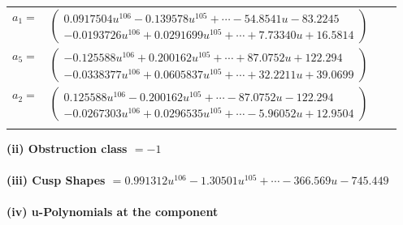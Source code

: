 \documentclass[1p]{elsarticle_modified}
\theoremstyle{definition}
\begin{document}
\begin{tabular}{m{7pt} m{180pt} m{7pt} m{180pt} }
\flushright $a_{1}=$&$\begin{pmatrix}0.0917504 u^{106}-0.139578 u^{105}+\cdots-54.8541 u-83.2245\\-0.0193726 u^{106}+0.0291699 u^{105}+\cdots+7.73340 u+16.5814\end{pmatrix}$ \\
\flushright $a_{5}=$&$\begin{pmatrix}-0.125588 u^{106}+0.200162 u^{105}+\cdots+87.0752 u+122.294\\-0.0338377 u^{106}+0.0605837 u^{105}+\cdots+32.2211 u+39.0699\end{pmatrix}$ \\
\flushright $a_{2}=$&$\begin{pmatrix}0.125588 u^{106}-0.200162 u^{105}+\cdots-87.0752 u-122.294\\-0.0267303 u^{106}+0.0296535 u^{105}+\cdots-5.96052 u+12.9504\end{pmatrix}$\\&\end{tabular}
\flushleft \textbf{(ii) Obstruction class $= -1$}\\~\\
\flushleft \textbf{(iii) Cusp Shapes $= 0.991312 u^{106}-1.30501 u^{105}+\cdots-366.569 u-745.449$}\\~\\
\newpage\renewcommand{\arraystretch}{1}
\flushleft \textbf{(iv) u-Polynomials at the component}\newline \\
\end{document}
